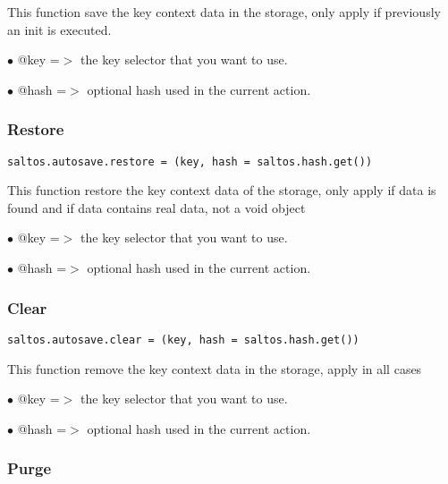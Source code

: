 \documentclass[a4paper]{article}
\begin{document}
This function save the key context data in the storage, only apply if previously
an init is executed.

\begin{compactitem}
\item[\color{myblue}$\bullet$] @key  =$>$ the key selector that you want to use.
\item[\color{myblue}$\bullet$] @hash =$>$ optional hash used in the current action.
\end{compactitem}

\hypertarget{toc596}{}
\subsubsection{Restore}

\begin{lstlisting}
saltos.autosave.restore = (key, hash = saltos.hash.get())
\end{lstlisting}

This function restore the key context data of the storage, only apply if data is found
and if data contains real data, not a void object

\begin{compactitem}
\item[\color{myblue}$\bullet$] @key  =$>$ the key selector that you want to use.
\item[\color{myblue}$\bullet$] @hash =$>$ optional hash used in the current action.
\end{compactitem}

\hypertarget{toc597}{}
\subsubsection{Clear}

\begin{lstlisting}
saltos.autosave.clear = (key, hash = saltos.hash.get())
\end{lstlisting}

This function remove the key context data in the storage, apply in all cases

\begin{compactitem}
\item[\color{myblue}$\bullet$] @key  =$>$ the key selector that you want to use.
\item[\color{myblue}$\bullet$] @hash =$>$ optional hash used in the current action.
\end{compactitem}

\hypertarget{toc598}{}
\subsubsection{Purge}
\end{document}
